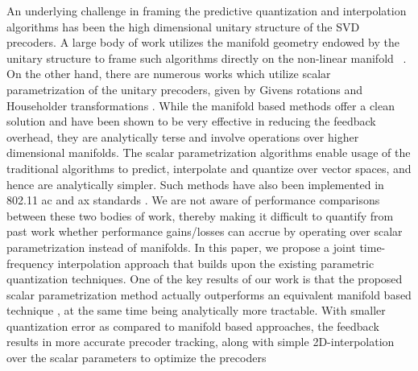 \documentclass[journal,10pt,twocolumn]{IEEEtran}
\begin{document}

An underlying challenge in framing the predictive quantization and interpolation algorithms has been the high dimensional unitary structure of the SVD precoders. A large body of work utilizes the manifold geometry endowed by the unitary structure to frame such algorithms directly on the non-linear manifold ~\cite{schwarz2013adaptive,5946308,6891198,Gupt1905:Predictive,pitaval2013codebooks}. On the other hand, there are numerous works which utilize scalar parametrization of the unitary precoders, given by Givens rotations and Householder transformations \cite{4114278,4556174,lou2013comparison}. While the manifold based methods offer a clean solution and have been shown to be very effective in reducing the feedback overhead, they are analytically terse and
involve operations over higher dimensional manifolds. The scalar parametrization algorithms enable usage of the traditional algorithms to predict, interpolate and quantize over vector spaces, and hence are analytically simpler.
Such methods have also been implemented in 802.11 ac and ax standards
\cite{lou2013comparison,ieee80211}. We are not aware of performance comparisons
between these two bodies of work, thereby making it difficult to
quantify from past work whether performance gains/losses can accrue by operating over scalar parametrization instead of manifolds. In this paper, we propose a joint time-frequency interpolation approach that builds upon the existing parametric quantization techniques. 
One of the key results of our work is that the proposed scalar parametrization method actually outperforms an equivalent manifold based technique \cite{Gupt1905:Predictive}, at the same time being analytically more tractable.
With smaller quantization error as compared to manifold based approaches, the feedback
results in more accurate precoder tracking, along with simple 2D-interpolation over the
scalar parameters to optimize the precoders
\end{document}
